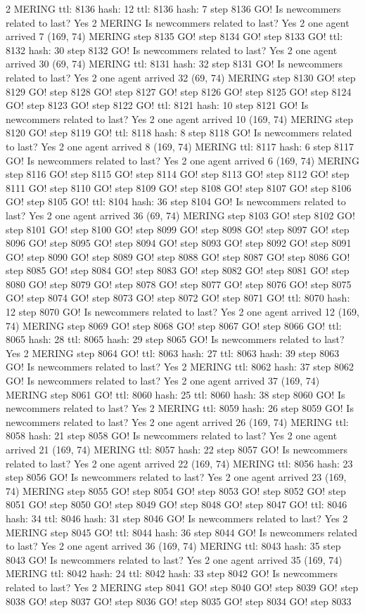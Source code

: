2 MERING ttl: 8136 hash: 12 ttl: 8136 hash: 7 step 8136 GO! Is newcommers related to last? Yes 2 MERING Is newcommers related to last? Yes 2 one agent arrived 7 (169, 74) MERING step 8135 GO! step 8134 GO! step 8133 GO! ttl: 8132 hash: 30 step 8132 GO! Is newcommers related to last? Yes 2 one agent arrived 30 (69, 74) MERING ttl: 8131 hash: 32 step 8131 GO! Is newcommers related to last? Yes 2 one agent arrived 32 (69, 74) MERING step 8130 GO! step 8129 GO! step 8128 GO! step 8127 GO! step 8126 GO! step 8125 GO! step 8124 GO! step 8123 GO! step 8122 GO! ttl: 8121 hash: 10 step 8121 GO! Is newcommers related to last? Yes 2 one agent arrived 10 (169, 74) MERING step 8120 GO! step 8119 GO! ttl: 8118 hash: 8 step 8118 GO! Is newcommers related to last? Yes 2 one agent arrived 8 (169, 74) MERING ttl: 8117 hash: 6 step 8117 GO! Is newcommers related to last? Yes 2 one agent arrived 6 (169, 74) MERING step 8116 GO! step 8115 GO! step 8114 GO! step 8113 GO! step 8112 GO! step 8111 GO! step 8110 GO! step 8109 GO! step 8108 GO! step 8107 GO! step 8106 GO! step 8105 GO! ttl: 8104 hash: 36 step 8104 GO! Is newcommers related to last? Yes 2 one agent arrived 36 (69, 74) MERING step 8103 GO! step 8102 GO! step 8101 GO! step 8100 GO! step 8099 GO! step 8098 GO! step 8097 GO! step 8096 GO! step 8095 GO! step 8094 GO! step 8093 GO! step 8092 GO! step 8091 GO! step 8090 GO! step 8089 GO! step 8088 GO! step 8087 GO! step 8086 GO! step 8085 GO! step 8084 GO! step 8083 GO! step 8082 GO! step 8081 GO! step 8080 GO! step 8079 GO! step 8078 GO! step 8077 GO! step 8076 GO! step 8075 GO! step 8074 GO! step 8073 GO! step 8072 GO! step 8071 GO! ttl: 8070 hash: 12 step 8070 GO! Is newcommers related to last? Yes 2 one agent arrived 12 (169, 74) MERING step 8069 GO! step 8068 GO! step 8067 GO! step 8066 GO! ttl: 8065 hash: 28 ttl: 8065 hash: 29 step 8065 GO! Is newcommers related to last? Yes 2 MERING step 8064 GO! ttl: 8063 hash: 27 ttl: 8063 hash: 39 step 8063 GO! Is newcommers related to last? Yes 2 MERING ttl: 8062 hash: 37 step 8062 GO! Is newcommers related to last? Yes 2 one agent arrived 37 (169, 74) MERING step 8061 GO! ttl: 8060 hash: 25 ttl: 8060 hash: 38 step 8060 GO! Is newcommers related to last? Yes 2 MERING ttl: 8059 hash: 26 step 8059 GO! Is newcommers related to last? Yes 2 one agent arrived 26 (169, 74) MERING ttl: 8058 hash: 21 step 8058 GO! Is newcommers related to last? Yes 2 one agent arrived 21 (169, 74) MERING ttl: 8057 hash: 22 step 8057 GO! Is newcommers related to last? Yes 2 one agent arrived 22 (169, 74) MERING ttl: 8056 hash: 23 step 8056 GO! Is newcommers related to last? Yes 2 one agent arrived 23 (169, 74) MERING step 8055 GO! step 8054 GO! step 8053 GO! step 8052 GO! step 8051 GO! step 8050 GO! step 8049 GO! step 8048 GO! step 8047 GO! ttl: 8046 hash: 34 ttl: 8046 hash: 31 step 8046 GO! Is newcommers related to last? Yes 2 MERING step 8045 GO! ttl: 8044 hash: 36 step 8044 GO! Is newcommers related to last? Yes 2 one agent arrived 36 (169, 74) MERING ttl: 8043 hash: 35 step 8043 GO! Is newcommers related to last? Yes 2 one agent arrived 35 (169, 74) MERING ttl: 8042 hash: 24 ttl: 8042 hash: 33 step 8042 GO! Is newcommers related to last? Yes 2 MERING step 8041 GO! step 8040 GO! step 8039 GO! step 8038 GO! step 8037 GO! step 8036 GO! step 8035 GO! step 8034 GO! step 8033 